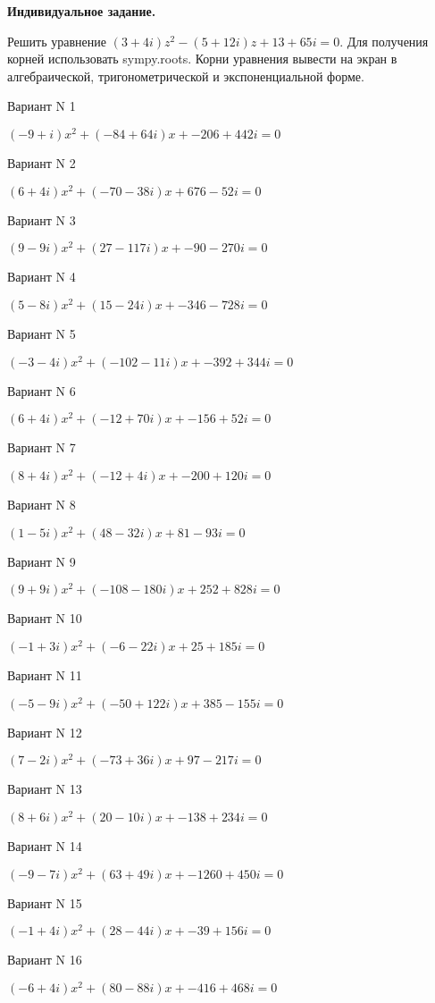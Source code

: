 \documentclass[11pt]{report}
\begin{document}
\pagestyle{empty}

{\bf Индивидуальное задание.}


Решить уравнение $(3 + 4i)z^2 - (5 + 12i)z + 13 +65i = 0$.
Для получения корней использовать sympy.roots.
Корни уравнения вывести на экран в алгебраической, тригонометрической и экспоненциальной форме.

Вариант N 1

$(-9 + i)x^2 + (-84 + 64 i)x + -206 + 442 i = 0$

Вариант N 2

$(6 + 4 i)x^2 + (-70 - 38 i)x + 676 - 52 i = 0$

Вариант N 3

$(9 - 9 i)x^2 + (27 - 117 i)x + -90 - 270 i = 0$

Вариант N 4

$(5 - 8 i)x^2 + (15 - 24 i)x + -346 - 728 i = 0$

Вариант N 5

$(-3 - 4 i)x^2 + (-102 - 11 i)x + -392 + 344 i = 0$

Вариант N 6

$(6 + 4 i)x^2 + (-12 + 70 i)x + -156 + 52 i = 0$

Вариант N 7

$(8 + 4 i)x^2 + (-12 + 4 i)x + -200 + 120 i = 0$

Вариант N 8

$(1 - 5 i)x^2 + (48 - 32 i)x + 81 - 93 i = 0$

Вариант N 9

$(9 + 9 i)x^2 + (-108 - 180 i)x + 252 + 828 i = 0$

Вариант N 10

$(-1 + 3 i)x^2 + (-6 - 22 i)x + 25 + 185 i = 0$

Вариант N 11

$(-5 - 9 i)x^2 + (-50 + 122 i)x + 385 - 155 i = 0$

Вариант N 12

$(7 - 2 i)x^2 + (-73 + 36 i)x + 97 - 217 i = 0$

Вариант N 13

$(8 + 6 i)x^2 + (20 - 10 i)x + -138 + 234 i = 0$

Вариант N 14

$(-9 - 7 i)x^2 + (63 + 49 i)x + -1260 + 450 i = 0$

Вариант N 15

$(-1 + 4 i)x^2 + (28 - 44 i)x + -39 + 156 i = 0$

Вариант N 16

$(-6 + 4 i)x^2 + (80 - 88 i)x + -416 + 468 i = 0$
\end{document}
